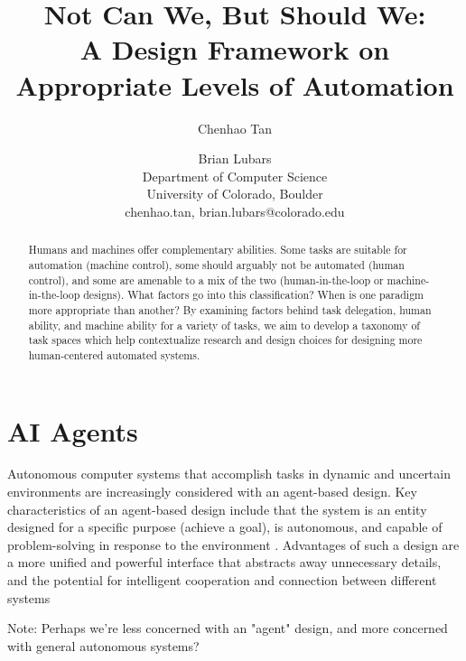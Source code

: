 \documentclass[letterpaper]{article} %
\begin{document}
%
\title{Not Can We, But Should We: \\A Design Framework on Appropriate Levels of Automation}

\author{Chenhao Tan \and Brian Lubars\\
Department of Computer Science\\
University of Colorado, Boulder\\
{chenhao.tan, brian.lubars}@colorado.edu\\
}


\maketitle
\begin{abstract}
Humans and machines offer complementary abilities. Some tasks are suitable for automation (machine control), some should arguably not be automated (human control), and some are amenable to a mix of the two (human-in-the-loop or machine-in-the-loop designs). What factors go into this classification? When is one paradigm more appropriate than another? By examining factors behind task delegation, human ability, and machine ability for a variety of tasks, we aim to develop a taxonomy of task spaces which help contextualize research and design choices for designing more human-centered automated systems.
\end{abstract}

\section{AI Agents}
Autonomous computer systems that accomplish tasks in dynamic and uncertain environments are increasingly considered with an agent-based design. Key characteristics of an agent-based design include that the system is an entity designed for a specific purpose (achieve a goal), is autonomous, and capable of problem-solving in response to the environment \cite{jennings-2000}. Advantages of such a design are a more unified and powerful interface that abstracts away unnecessary details, and the potential for intelligent cooperation and connection between different systems \cite{bradshaw}

Note: Perhaps we're less concerned with an "agent" design, and more concerned with general autonomous systems? 
\end{document}
